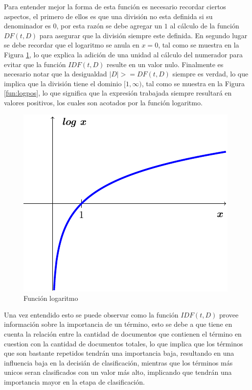 \documentclass[conference,compsoc]{IEEEtran}
\begin{document}
Para entender mejor la forma de esta función es necesario recordar ciertos aspectos, el primero de ellos es que una división no esta definida si su denominador es $0$, por esta razón se debe agregar un $1$ al cálculo de la función $DF(t,D)$ para asegurar que la división siempre este definida. En segundo lugar se debe recordar que el logaritmo se anula en $x=0$, tal como se muestra en la Figura \ref{fun:log}, lo que explica la adición de una unidad al cálculo del numerador para evitar que la función $IDF(t,D)$ resulte en un valor nulo. Finalmente es necesario notar que la desigualdad $|D| >= DF(t,D)$ siempre es verdad, lo que implica que la división tiene el dominio $[1,\infty)$, tal como se muestra en la Figura \ref{fun:logpos}, lo que significa que la expresión trabajada siempre resultará en valores positivos, los cuales son acotados por la función logaritmo.

\begin{figure}[H]
    \includegraphics[scale=1]{Logarithm.pdf}
    \caption{Función logaritmo}
    \label{fun:log}
\end{figure}

Una vez entendido esto se puede observar como la función $IDF(t,D)$ provee información sobre la importancia de un término, esto se debe a que tiene en cuenta la relación entre la cantidad de documentos que contienen el término en cuestion con la cantidad de documentos totales, lo que implica que los términos que son bastante repetidos tendrán una importancia baja, resultando en una influencia baja en la decisián de clasificación, mientras que los términos más unicos seran clasificados con un valor más alto, implicando
que tendrán una importancia mayor en la etapa de clasificación.
\end{document}
